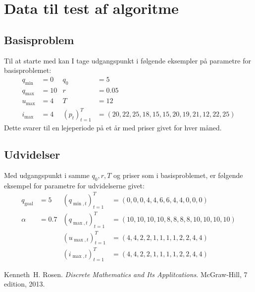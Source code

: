 \documentclass[12pt,oneside,final]{article}
\newcommand{\1}{\mathbbm{1}}
\begin{document}
\clearpage

\section{Data til test af algoritme}

\subsection{Basisproblem}

Til at starte med kan I tage udgangspunkt i følgende eksempler på parametre for basisproblemet:
%
\begin{align*}
  q_{\min} &= 0 & q_{0} &= 5 \\
  q_{\max} &= 10 & r &= 0.05 \\
  u_{\max} &= 4 &  T &= 12 \\
  i_{\max} &= 4 &  (p_{t})_{t=1}^{T} &= (20, 22, 25, 18, 15, 15, 20, 19, 21, 12, 22, 25)
\end{align*}
%
Dette svarer til en lejeperiode på et år med priser givet for hver måned.


\subsection{Udvidelser}

Med udgangspunkt i samme \(q_{0}, r, T\) og priser som i basisproblemet, er følgende eksempel for parametre for udvidelserne givet:
%
\begin{align*}
  q_{\mathrm{goal}} & = 5   & (q_{\min,t})_{t=1}^{T} & = (0, 0, 0, 4, 4, 6, 6, 4, 4, 0, 0, 0)          \\
  \alpha            & = 0.7 & (q_{\max,t})_{t=1}^{T} & = (10, 10, 10, 10, 8, 8, 8, 8, 10, 10, 10, 10)  \\
                    &       & (u_{\max,t})_{t=1}^{T} & = (4, 4, 2, 2, 1, 1, 1, 1, 2, 2, 4, 4)          \\
                    &       & (i_{\max,t})_{t=1}^{T} & = (4, 4, 2, 2, 1, 1, 1, 1, 2, 2, 4, 4)
\end{align*}


\begin{thebibliography}{99}
  Kenneth~H. Rosen.
  \newblock \emph{Discrete {M}athematics and {I}ts {A}pplitcations}.
  \newblock McGraw-Hill, 7 edition, 2013.
\end{thebibliography}
\end{document}

